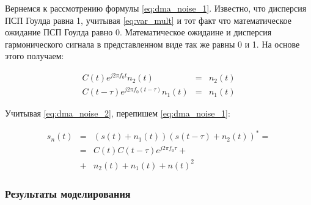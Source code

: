 Вернемся к рассмотрению формулы \ref{eq:dma_noise_1}. Известно, что дисперсия ПСП Гоулда равна 1, учитывая \ref{eq:var_mult}
и тот факт что математическое ожидание ПСП Гоулда равно 0. Математическое ожидаине и дисперсия гармонического сигнала в
представленном виде так же равны 0 и 1. На основе этого получаем:
\begin{center}
\begin{eqnarray}
	\label{eq:dma_noise_2}
	C(t)e^{j2{\pi}f_{0}t}n_{2}(t) & = & n_{2}(t) \nonumber \\
	C(t-\tau)e^{j2{\pi}f_{0}(t-\tau)}n_{1}(t) & = & n_{1}(t)
\end{eqnarray}
\end{center}

Учитывая \ref{eq:dma_noise_2}, перепишем \ref{eq:dma_noise_1}:
\begin{center}
\begin{eqnarray}
	s_{n}(t) & = & (s(t)+n_{1}(t))(s(t-\tau)+n_{2}(t))^{*}=\nonumber \\
	 & = & C(t)C(t-\tau)e^{j2{\pi}f_{0}{\tau}}+\label{eq:dma_noise_3}\\
	 & + & n_{2}(t) + n_{1}(t) + n(t)^{2}\nonumber
\end{eqnarray}
\end{center}

\subsubsection{Результаты моделирования}
\label{sssec:dma_simulate}

\newpage
